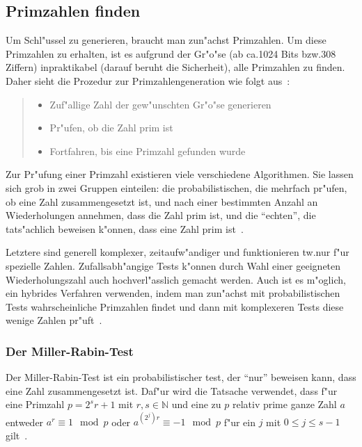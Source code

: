 \documentclass[12pt]{article}
\begin{document}
\subsection{Primzahlen finden}
Um Schl"ussel zu generieren, braucht man zun"achst Primzahlen.
Um diese Primzahlen zu erhalten, ist es aufgrund der Gr"o"se
(ab ca.\@ 1024 Bits bzw.\@ 308 Ziffern)
inpraktikabel (darauf beruht die Sicherheit), alle Primzahlen zu finden.
Daher sieht die Prozedur zur Primzahlengeneration wie folgt aus~\cite{hac}:
\begin{quote}
\begin{itemize}
    \item Zuf"allige Zahl der gew"unschten Gr"o"se generieren
    \item Pr"ufen, ob die Zahl prim ist
    \item Fortfahren, bis eine Primzahl gefunden wurde
\end{itemize}
\end{quote}

Zur Pr"ufung einer Primzahl existieren viele verschiedene Algorithmen.
Sie lassen sich grob in zwei Gruppen einteilen:
die probabilistischen, die mehrfach pr"ufen, ob eine Zahl zusammengesetzt ist,
und nach einer bestimmten Anzahl an Wiederholungen annehmen, dass die Zahl prim ist,
und die "`echten"', die tats"achlich beweisen k"onnen, dass eine Zahl prim ist~\cite{hac}.

Letztere sind generell komplexer, zeitaufw"andiger und funktionieren tw.\@ nur
f"ur spezielle Zahlen.
Zufallsabh"angige Tests k"onnen durch Wahl einer geeigneten Wiederholungszahl
auch hochverl"asslich gemacht werden.
Auch ist es m"oglich, ein hybrides Verfahren verwenden,
indem man zun"achst mit probabilistischen Tests
wahrscheinliche Primzahlen findet und dann mit komplexeren Tests
diese wenige Zahlen pr"uft~\cite{hac}.

\subsubsection{Der Miller-Rabin-Test}
Der Miller-Rabin-Test ist ein probabilistischer test, der "`nur"' beweisen kann,
dass eine Zahl zusammengesetzt ist.
Daf"ur wird die Tatsache verwendet, dass f"ur eine Primzahl $p = 2^s r+1$ mit $r, s \in \mathbb{N}$
und eine zu $p$ relativ prime ganze Zahl $a$ entweder $a^r \equiv 1 \mod p$ oder
$a^{(2^j)r} \equiv -1 \mod p$ f"ur ein $j$ mit $0 \leq j \leq s-1$ gilt~\cite{hac}.
\end{document}
